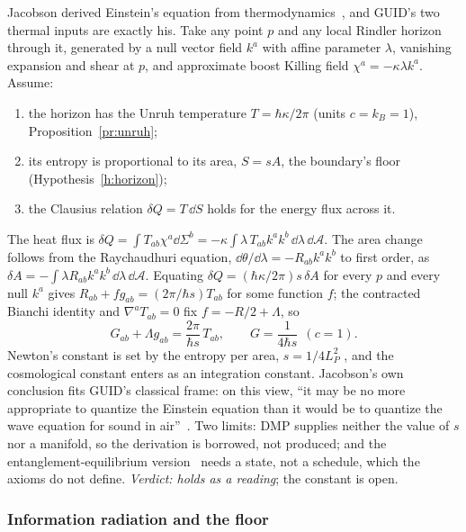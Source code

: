 Jacobson derived Einstein's equation from thermodynamics~\cite{jacobson95}, and GUID's two thermal inputs are exactly his. Take any point
$p$ and any local Rindler horizon through it, generated by a null vector field $k^a$ with affine parameter $\lambda$, vanishing expansion and
shear at $p$, and approximate boost Killing field $\chi^a=-\kappa\lambda k^a$. Assume:
\begin{enumerate}[nosep]
\item the horizon has the Unruh temperature $T=\hbar\kappa/2\pi$ (units $c=k_B=1$), Proposition~\ref{pr:unruh};
\item its entropy is proportional to its area, $S=sA$, the boundary's floor (Hypothesis~\ref{h:horizon});
\item the Clausius relation $\delta Q=T\,\dd S$ holds for the energy flux across it.
\end{enumerate}
The heat flux is $\delta Q=\int T_{ab}\chi^a\dd\Sigma^b=-\kappa\int\lambda\,T_{ab}k^ak^b\,\dd\lambda\,\dd\mathcal A$. The area change follows
from the Raychaudhuri equation, $\dd\theta/\dd\lambda=-R_{ab}k^ak^b$ to first order, as $\delta A=-\int\lambda R_{ab}k^ak^b\,\dd\lambda\,\dd\mathcal A$.
Equating $\delta Q=(\hbar\kappa/2\pi)s\,\delta A$ for every $p$ and every null $k^a$ gives
$R_{ab}+f g_{ab}=(2\pi/\hbar s)T_{ab}$ for some function $f$; the contracted Bianchi identity and $\nabla^aT_{ab}=0$ fix
$f=-R/2+\Lambda$, so
\begin{equation}\label{eq:jacobson}
G_{ab}+\Lambda g_{ab}=\frac{2\pi}{\hbar s}\,T_{ab},\qquad G=\frac{1}{4\hbar s}\ \ (c=1).
\end{equation}
Newton's constant is set by the entropy per area, $s=1/4L_P^2$ , and the cosmological constant enters as an integration
constant. Jacobson's own conclusion fits GUID's classical frame: on this view, ``it may be no more appropriate to quantize the Einstein
equation than it would be to quantize the wave equation for sound in air''~\cite{jacobson95}. Two limits: DMP supplies neither the value of $s$ nor
a manifold, so the derivation is borrowed, not produced; and the entanglement-equilibrium version~\cite{jacobson16} needs a state, not a
schedule, which the axioms do not define. \emph{Verdict: holds as a reading}; the constant is open.

\subsubsection{Information radiation and the floor}

